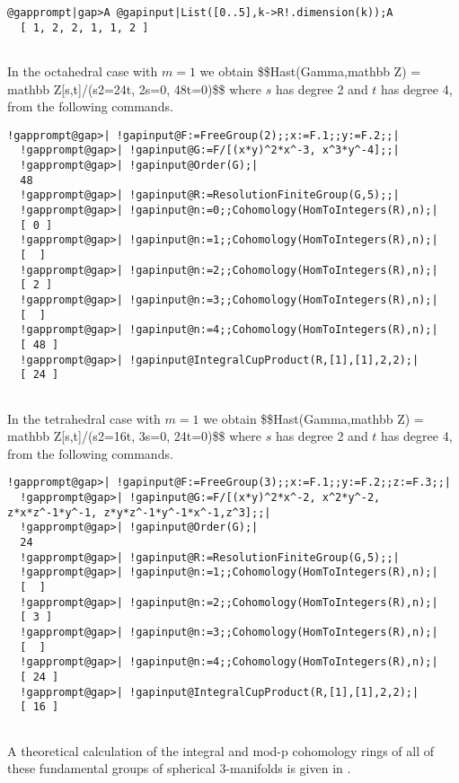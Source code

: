 \documentclass[a4paper,11pt]{report}
\begin{document}
{{\begin{Verbatim}[commandchars=@|A,fontsize=\small,frame=single,label=Example]
  @gapprompt|gap>A @gapinput|List([0..5],k->R!.dimension(k));A
  [ 1, 2, 2, 1, 1, 2 ]
  
\end{Verbatim}
 In the octahedral case with $m=1$ we obtain
\$\$H\texttt{}\texttt{}ast(\texttt{}Gamma,\texttt{}mathbb
Z) = \texttt{}mathbb Z[s,t]/(s\texttt{}2=24t, 2s=0,
48t=0)\$\$ where $s$ has degree 2 and $t$ has degree 4, from the following commands. 
\begin{Verbatim}[commandchars=!@|,fontsize=\small,frame=single,label=Example]
  !gapprompt@gap>| !gapinput@F:=FreeGroup(2);;x:=F.1;;y:=F.2;;|
  !gapprompt@gap>| !gapinput@G:=F/[(x*y)^2*x^-3, x^3*y^-4];;|
  !gapprompt@gap>| !gapinput@Order(G);|
  48
  !gapprompt@gap>| !gapinput@R:=ResolutionFiniteGroup(G,5);;|
  !gapprompt@gap>| !gapinput@n:=0;;Cohomology(HomToIntegers(R),n);|
  [ 0 ]
  !gapprompt@gap>| !gapinput@n:=1;;Cohomology(HomToIntegers(R),n);|
  [  ]
  !gapprompt@gap>| !gapinput@n:=2;;Cohomology(HomToIntegers(R),n);|
  [ 2 ]
  !gapprompt@gap>| !gapinput@n:=3;;Cohomology(HomToIntegers(R),n);|
  [  ]
  !gapprompt@gap>| !gapinput@n:=4;;Cohomology(HomToIntegers(R),n);|
  [ 48 ]
  !gapprompt@gap>| !gapinput@IntegralCupProduct(R,[1],[1],2,2);|
  [ 24 ]
  
\end{Verbatim}
 In the tetrahedral case with $m=1$ we obtain
\$\$H\texttt{}\texttt{}ast(\texttt{}Gamma,\texttt{}mathbb
Z) = \texttt{}mathbb Z[s,t]/(s\texttt{}2=16t, 3s=0,
24t=0)\$\$ where $s$ has degree 2 and $t$ has degree 4, from the following commands. 
\begin{Verbatim}[commandchars=!@|,fontsize=\small,frame=single,label=Example]
  !gapprompt@gap>| !gapinput@F:=FreeGroup(3);;x:=F.1;;y:=F.2;;z:=F.3;;|
  !gapprompt@gap>| !gapinput@G:=F/[(x*y)^2*x^-2, x^2*y^-2, z*x*z^-1*y^-1, z*y*z^-1*y^-1*x^-1,z^3];;|
  !gapprompt@gap>| !gapinput@Order(G);|
  24
  !gapprompt@gap>| !gapinput@R:=ResolutionFiniteGroup(G,5);;|
  !gapprompt@gap>| !gapinput@n:=1;;Cohomology(HomToIntegers(R),n);|
  [  ]
  !gapprompt@gap>| !gapinput@n:=2;;Cohomology(HomToIntegers(R),n);|
  [ 3 ]
  !gapprompt@gap>| !gapinput@n:=3;;Cohomology(HomToIntegers(R),n);|
  [  ]
  !gapprompt@gap>| !gapinput@n:=4;;Cohomology(HomToIntegers(R),n);|
  [ 24 ]
  !gapprompt@gap>| !gapinput@IntegralCupProduct(R,[1],[1],2,2);|
  [ 16 ]
  
\end{Verbatim}
 A theoretical calculation of the integral and mod-p cohomology rings of all of
these fundamental groups of spherical 3-manifolds is given in \cite{tomoda}. }

}
\end{document}
